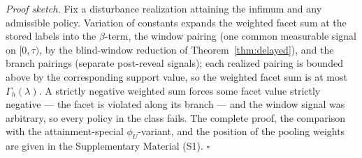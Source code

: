 \documentclass[10pt,twocolumn]{article}
\theoremstyle{definition}
\begin{document}
\emph{Proof sketch.} Fix a disturbance realization attaining the infimum and any admissible policy. Variation of constants expands the weighted facet sum at the stored labels into the \(\beta\)-term, the window pairing (one common measurable signal on \([0, \tau)\), by the blind-window reduction of Theorem~\ref{thm:delayed}), and the branch pairings (separate post-reveal signals); each realized pairing is bounded above by the corresponding support value, so the weighted facet sum is at most \(\Gamma_{h}(\lambda)\). A strictly negative weighted sum forces some facet value strictly negative --- the facet is violated along its branch --- and the window signal was arbitrary, so every policy in the class fails. The complete proof, the comparison with the attainment-special \(\phi_{U}\)-variant, and the position of the pooling weights are given in the Supplementary Material (S1). \hfill\(\square\)
\end{document}
